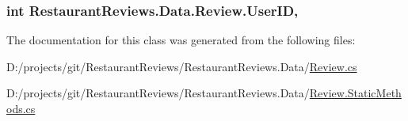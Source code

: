 \subsubsection[{\texorpdfstring{User\+ID}{UserID}}]{\setlength{\rightskip}{0pt plus 5cm}int Restaurant\+Reviews.\+Data.\+Review.\+User\+ID\hspace{0.3cm}{\ttfamily [get]}, {\ttfamily [set]}}\hypertarget{class_restaurant_reviews_1_1_data_1_1_review_a61b089604a847d3137f398e711c8fecd}{}\label{class_restaurant_reviews_1_1_data_1_1_review_a61b089604a847d3137f398e711c8fecd}


The documentation for this class was generated from the following files\+:\begin{DoxyCompactItemize}
\item 
D\+:/projects/git/\+Restaurant\+Reviews/\+Restaurant\+Reviews.\+Data/\hyperlink{_review_8cs}{Review.\+cs}\item 
D\+:/projects/git/\+Restaurant\+Reviews/\+Restaurant\+Reviews.\+Data/\hyperlink{_review_8_static_methods_8cs}{Review.\+Static\+Methods.\+cs}\end{DoxyCompactItemize}
